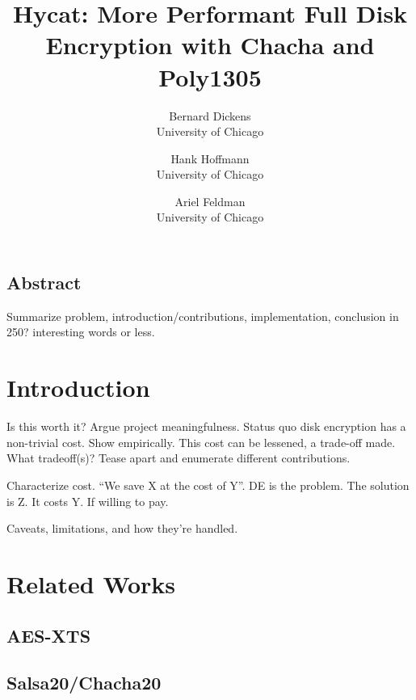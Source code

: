 \documentclass[letterpaper,twocolumn,10pt]{article}
\begin{document}
\date{}

\title{\Large \bf Hycat: More Performant Full Disk Encryption with Chacha and Poly1305}

\author{
{\rm Bernard Dickens}\\
University of Chicago
\and
{\rm Hank Hoffmann}\\
University of Chicago
\and
{\rm Ariel Feldman}\\
University of Chicago
} %

\maketitle

\thispagestyle{empty}


\subsection*{Abstract}
Summarize problem, introduction/contributions, implementation, conclusion in 250? interesting words or less.

\section{Introduction}
Is this worth it? Argue project meaningfulness. Status quo disk encryption has a non-trivial cost. Show empirically.
This cost can be lessened, a trade-off made. What tradeoff(s)? Tease apart and enumerate different contributions.

Characterize cost. ``We save X at the cost of Y''. DE is the problem. The solution is Z. It costs Y. If willing to pay.

Caveats, limitations, and how they're handled.

\section{Related Works}
\subsection{AES-XTS}
\subsection{Salsa20/Chacha20}
\end{document}
